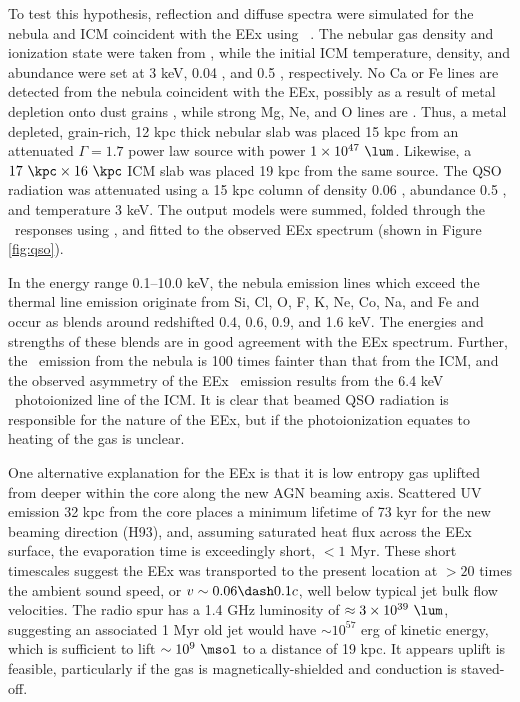 \documentclass[useAMS,usenatbib]{mn2e}
\begin{document}
To test this hypothesis, reflection and diffuse spectra were simulated
for the nebula and ICM coincident with the EEx using
\cloudy\ \citep{cloudy}. The nebular gas density and ionization state
were taken from \citet{2000AJ....120..562T}, while the initial ICM
temperature, density, and abundance were set at 3 keV, 0.04 \pcc, and
0.5 \Zsol, respectively. No Ca or Fe lines are detected from the
nebula coincident with the EEx, possibly as a result of metal
depletion onto dust grains \citep[\eg][]{1993ApJ...414L..17D}, while
strong Mg, Ne, and O lines are \citep{2000AJ....120..562T}. Thus, a
metal depleted, grain-rich, 12 kpc thick nebular slab was placed 15
kpc from an attenuated $\Gamma = 1.7$ power law source with power $1
\times 10^{47} ~\lum$. Likewise, a $17 ~\kpc \times 16 ~\kpc$ ICM slab
was placed 19 kpc from the same source. The QSO radiation was
attenuated using a 15 kpc column of density 0.06 \pcc, abundance 0.5
\Zsol, and temperature 3 keV. The output models were summed, folded
through the \cxo\ responses using \xspec, and fitted to the observed
EEx spectrum (shown in Figure \ref{fig:qso}).

In the energy range 0.1--10.0 keV, the nebula emission lines which
exceed the thermal line emission originate from Si, Cl, O, F, K, Ne,
Co, Na, and Fe and occur as blends around redshifted 0.4, 0.6, 0.9,
and 1.6 keV. The energies and strengths of these blends are in good
agreement with the EEx spectrum. Further, the \feka\ emission from the
nebula is 100 times fainter than that from the ICM, and the observed
asymmetry of the EEx \feka\ emission results from the 6.4 keV
\feka\ photoionized line of the ICM. It is clear that beamed QSO
radiation is responsible for the nature of the EEx, but if the
photoionization equates to heating of the gas is unclear.

One alternative explanation for the EEx is that it is low entropy gas
uplifted from deeper within the core along the new AGN beaming
axis. Scattered UV emission 32 kpc from the core places a minimum
lifetime of 73 kyr for the new beaming direction (H93), and, assuming
saturated heat flux across the EEx surface, the evaporation time is
exceedingly short, $< 1$ Myr. These short timescales suggest the EEx
was transported to the present location at $> 20$ times the ambient
sound speed, or $v \sim 0.06 \dash 0.1c$, well below typical jet bulk
flow velocities. The radio spur has a 1.4 GHz luminosity of $\approx 3
\times 10^{39} ~\lum$, suggesting an associated 1 Myr old jet would
have $\sim 10^{57}$ erg of kinetic energy, which is sufficient to lift
$\sim 10^{9} ~\msol$ to a distance of 19 kpc. It appears uplift is
feasible, particularly if the gas is magnetically-shielded and
conduction is staved-off.
\end{document}
